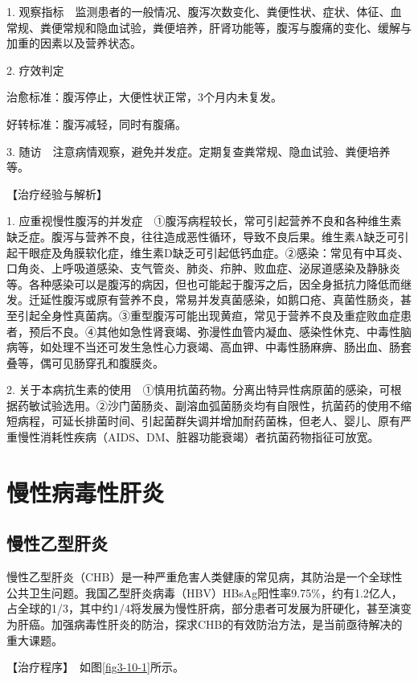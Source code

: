 1.
观察指标　监测患者的一般情况、腹泻次数变化、粪便性状、症状、体征、血常规、粪便常规和隐血试验，粪便培养，肝肾功能等，腹泻与腹痛的变化、缓解与加重的因素以及营养状态。

2. 疗效判定

治愈标准：腹泻停止，大便性状正常，3个月内未复发。

好转标准：腹泻减轻，同时有腹痛。

3.
随访　注意病情观察，避免并发症。定期复查粪常规、隐血试验、粪便培养等。

【治疗经验与解析】

1.
应重视慢性腹泻的并发症　①腹泻病程较长，常可引起营养不良和各种维生素缺乏症。腹泻与营养不良，往往造成恶性循环，导致不良后果。维生素A缺乏可引起干眼症及角膜软化症，维生素D缺乏可引起低钙血症。②感染：常见有中耳炎、口角炎、上呼吸道感染、支气管炎、肺炎、疖肿、败血症、泌尿道感染及静脉炎等。各种感染可以是腹泻的病因，但也可能起于腹泻之后，因全身抵抗力降低而继发。迁延性腹泻或原有营养不良，常易并发真菌感染，如鹅口疮、真菌性肠炎，甚至引起全身性真菌病。③重型腹泻可能出现黄疸，常见于营养不良及重症败血症患者，预后不良。④其他如急性肾衰竭、弥漫性血管内凝血、感染性休克、中毒性脑病等，如处理不当还可发生急性心力衰竭、高血钾、中毒性肠麻痹、肠出血、肠套叠等，偶可见肠穿孔和腹膜炎。

2.
关于本病抗生素的使用　①慎用抗菌药物。分离出特异性病原菌的感染，可根据药敏试验选用。②沙门菌肠炎、副溶血弧菌肠炎均有自限性，抗菌药的使用不缩短病程，可延长排菌时间、引起菌群失调并增加耐药菌株，但老人、婴儿、原有严重慢性消耗性疾病（AIDS、DM、脏器功能衰竭）者抗菌药物指征可放宽。

\section{慢性病毒性肝炎}

\subsection{慢性乙型肝炎}

慢性乙型肝炎（CHB）是一种严重危害人类健康的常见病，其防治是一个全球性公共卫生问题。我国乙型肝炎病毒（HBV）HBsAg阳性率9.75\%，约有1.2亿人，占全球的1/3，其中约1/4将发展为慢性肝病，部分患者可发展为肝硬化，甚至演变为肝癌。加强病毒性肝炎的防治，探求CHB的有效防治方法，是当前亟待解决的重大课题。

【治疗程序】　如图\ref{fig3-10-1}所示。

